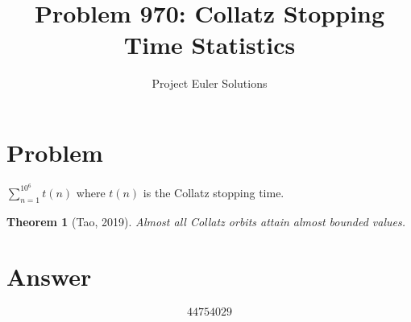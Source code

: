\documentclass[11pt]{article}
\title{Problem 970: Collatz Stopping Time Statistics}
\author{Project Euler Solutions}
\date{}
\newtheorem{theorem}{Theorem}
\begin{document}
\maketitle
\section{Problem}
$\sum_{n=1}^{10^6} t(n)$ where $t(n)$ is the Collatz stopping time.
\begin{theorem}[Tao, 2019]
Almost all Collatz orbits attain almost bounded values.
\end{theorem}
\section{Answer}

\[
\boxed{44754029}
\]
\end{document}
